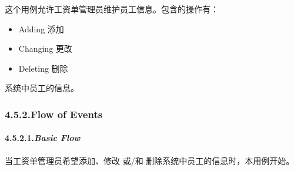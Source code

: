 \documentclass{article}
\begin{document}
\noindent{}这个用例允许工资单管理员维护员工信息。包含的操作有：%

\begin{itemize}[noitemsep,topsep=\mdcompacttopsep]%

\item{}Adding 添加%

\item{}Changing 更改%

\item{}Deleting  删除%
\end{itemize}%

\noindent{}系统中员工的信息。%

\subsubsection{4.5.2.\hspace*{0.5em}Flow of Events}\label{sec-flow-of-events}%

\paragraph{4.5.2.1.\hspace*{0.5em}\emph{Basic Flow}}\label{sec-_basic-flow_}%

\noindent{}\mdbr
{}当工资单管理员希望添加、修改 或/和 删除系统中员工的信息时，本用例开始。%
\end{document}
